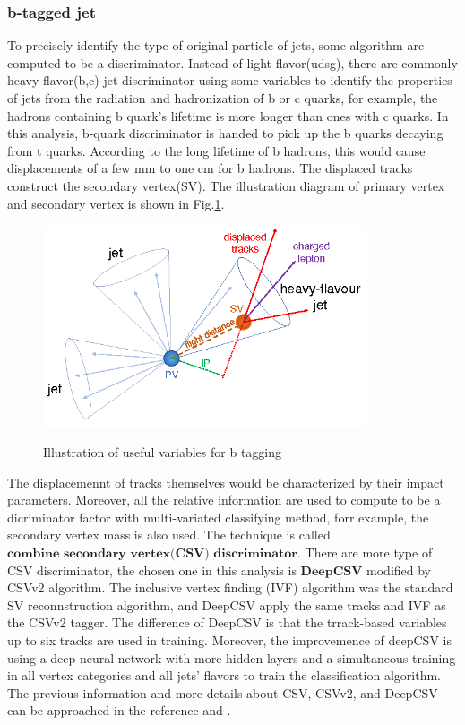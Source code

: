 		\subsubsection{b-tagged jet}
		\label{sssec:bjet}

			To precisely identify the type of original particle of jets, some algorithm are computed to be a discriminator. Instead of light-flavor(udsg), there are commonly heavy-flavor(b,c) jet discriminator using some variables to identify the properties of jets from the radiation and hadronization of b or c quarks, for example, the hadrons containing b quark's lifetime is more longer than ones with c quarks. In this analysis, b-quark discriminator is handed to pick up the b quarks decaying from t quarks. According to the long lifetime of b hadrons, this would cause displacements of a few mm to one cm for b hadrons. The displaced tracks construct the secondary vertex(SV). The illustration diagram of primary vertex and secondary vertex is shown in Fig.\ref{PhysObj:fig:PV_SV}. 

			\begin{figure}[H]
			\centering{}
		    	\includegraphics[width=0.85\textwidth]{Figures/PhysObj/PV_SV.png}\\
			\caption{Illustration of useful variables for b tagging \cite{CMS-BTV-16-002}}
			\label{PhysObj:fig:PV_SV}
			\end{figure}
			\FloatBarrier

			The displacemennt of tracks themselves would be characterized by their impact parameters. Moreover, all the relative information are used to compute to be a dicriminator factor with multi-variated classifying method, forr example, the secondary vertex mass is also used. The technique is called $\textbf{combine secondary vertex(CSV) discriminator}$. There are more type of CSV discriminator, the chosen one in this analysis is $\textbf{DeepCSV}$ modified by CSVv2 algorithm. The inclusive vertex finding (IVF) algorithm was the standard SV reconnstruction algorithm, and DeepCSV apply the same tracks and IVF as the CSVv2 tagger. The difference of DeepCSV is that the trrack-based variables up to six tracks are used in training. Moreover, the improvemence of deepCSV is using a deep neural network with more hidden layers and a simultaneous training in all vertex categories and all jets' flavors to train the classification algorithm. The previous information and more details about CSV, CSVv2, and DeepCSV can be approached in the reference \cite{CMS-PAS-BTV-15-001} and \cite{CMS-BTV-16-002}.

